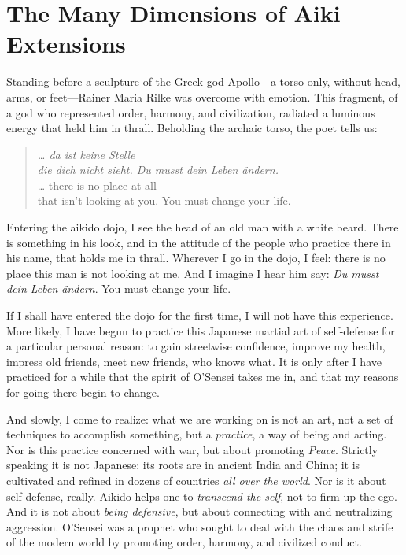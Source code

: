 \chapter[The Many Dimensions of Aiki Extensions (2003)]{The Many Dimensions of Aiki Extensions}

Standing before a sculpture of the Greek god Apollo---a torso only, without head, arms, or feet---Rainer Maria Rilke was overcome with emotion. This fragment, of a god who represented order, harmony, and civilization, radiated a luminous energy that held him in thrall. Beholding the archaic torso, the poet tells us:

\begin{verse}
\begin{flushright}
\emph{\ldots{} da ist keine Stelle \\
die dich nicht sieht. Du musst dein Leben \"{a}ndern.} \\
\ldots{} there is no place at all \\
that isn't looking at you. You must change your life.
\end{flushright}
\end{verse}

Entering the aikido dojo, I see the head of an old man with a white beard. There is something in his look, and in the attitude of the people who practice there in his name, that holds me in thrall. Wherever I go in the dojo, I feel: there is no place this man is not looking at me. And I imagine I hear him say: \emph{Du musst dein Leben \"{a}ndern}. You must change your life.

If I shall have entered the dojo for the first time, I will not have this experience. More likely, I have begun to practice this Japanese martial art of self-defense for a particular personal reason: to gain streetwise confidence, improve my health, impress old friends, meet new friends, who knows what. It is only after I have practiced for a while that the spirit of O'Sensei takes me in, and that my reasons for going there begin to change.

And slowly, I come to realize: what we are working on is not an art, not a set of techniques to accomplish something, but a \emph{practice}, a way of being and acting. Nor is this practice concerned with war, but about promoting \emph{Peace}. Strictly speaking it is not Japanese: its roots are in ancient India and China; it is cultivated and refined in dozens of countries \emph{all over the world}. Nor is it about self-defense, really. Aikido helps one to \emph{transcend the self}, not to firm up the ego. And it is not about \emph{being defensive}, but about connecting with and neutralizing aggression. O'Sensei was a prophet who sought to deal with the chaos and strife of the modern world by promoting order, harmony, and civilized conduct.

